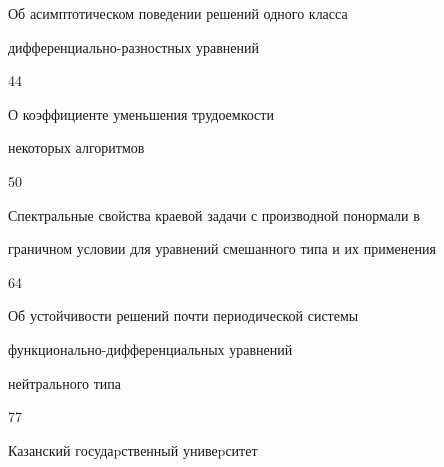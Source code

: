 {Об асимптотическом поведении решений одного класса 


дифференциально-\newline разностных уравнений}{44}




{О коэффициенте уменьшения трудоемкости


некоторых алгоритмов}{50}




{Спектральные свойства краевой задачи с производной по\newline нормали в 


граничном условии для уравнений смешанного типа и их применения}{64}




{Об устойчивости решений почти периодической системы


функционально-\newline дифференциальных уравнений


нейтрального типа}{77}














\vfill


\noindent\raisebox{2pt}{\copyright} Казанский госудаpственный унивеpситет





